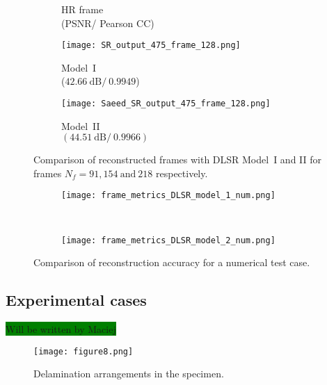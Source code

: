 \begin{figure} [!h]
\begin{subfigure}[b]{.32\textwidth}
		\caption{HR frame \\ (PSNR/ Pearson CC)}
		\label{fig:HR_3}
	\end{subfigure}
	\hfill
	\begin{subfigure}[b]{.32\textwidth}
		\centering
		\texttt{[image: SR\_output\_475\_frame\_128.png]}
		\caption{Model~I \\ ($42.66\ \text{dB}/\ 0.9949$)}
		\label{fig:num_f128_ijjeh}
	\end{subfigure}
	\hfill
	\begin{subfigure}[b]{.32\textwidth}
		\centering
		\texttt{[image: Saeed\_SR\_output\_475\_frame\_128.png]}
		\caption{Model~II \\ $(44.51\ \text{dB}/\ 0.9966)$}
		\label{fig:num_f128_saeed}	
	\end{subfigure}
	\caption{
		Comparison of reconstructed frames with DLSR Model~I and II for frames $N_f = 91, 154\ \text{and}\ 218 $ respectively. }
	\label{fig:num_results}
\end{figure}
\clearpage
\begin{figure} [h!]
	\centering
	\begin{subfigure}[b]{1\textwidth}
		\centering
		\texttt{[image: frame\_metrics\_DLSR\_model\_1\_num.png]}
		\label{fig:num_model_I}
	\end{subfigure} \\
	\begin{subfigure}[b]{1\textwidth}
		\centering
		\texttt{[image: frame\_metrics\_DLSR\_model\_2\_num.png]}
		\label{fig:num_model_II}
	\end{subfigure}
	\caption{Comparison of reconstruction accuracy for a numerical test case.}
	\label{fig:num_case_475_metrics}
\end{figure}

\subsection{Experimental cases}


\colorbox{green}{Will be written by Maciej}

\begin{figure} [h!]
	\centering
	\texttt{[image: figure8.png]}
	\caption{Delamination arrangements in the specimen.}
	\label{fig:specimen}
\end{figure}

